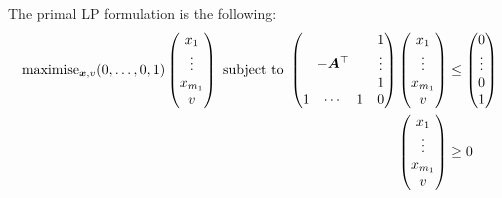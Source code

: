 	The primal LP formulation is the following:
	\begin{equation}
		\begin{split}
			\text{maximise}_{\vect{x},v}
			(0,\ldots,0,1) \begin{pmatrix}
				x_1 \\
				\vdots \\
				x_{m_1} \\
				v
			\end{pmatrix}
			\text{ subject to }
			\begin{pmatrix}
				& & & 1 \\
				& & & \vdots  \\
				\multicolumn{3}{c}
				{\raisebox{\dimexpr\normalbaselineskip+.7\ht\strutbox-.5\height}[0pt][0pt]
				{{$-\vect{A}^\top$}}} & 1 \\
				1 & \cdots & 1 & 0
			\end{pmatrix} \begin{pmatrix}
				x_1 \\
				\vdots \\
				x_{m_1} \\
				v
			\end{pmatrix} & \le \begin{pmatrix}
				0 \\
				\vdots \\
				0 \\
				1
			\end{pmatrix} \\
			\begin{pmatrix}
				x_1 \\
				\vdots \\
				x_{m_1} \\
				v
			\end{pmatrix} & \ge 0
		\end{split} 
	\end{equation}


